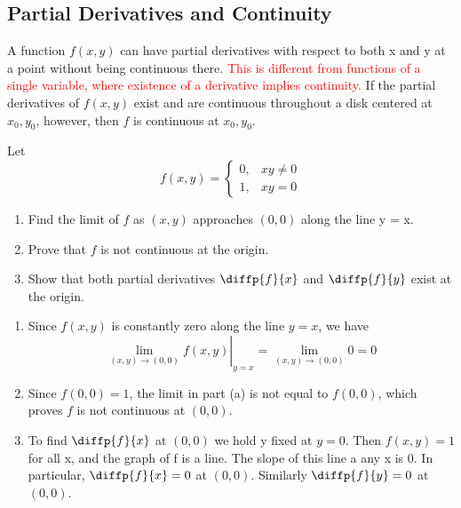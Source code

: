 \documentclass[12pt,a4paper,draft]{article}
\begin{document}
\subsection{Partial Derivatives and Continuity}

A function \(f(x,y)\) can have partial derivatives with respect to both x and y at a point without being continuous there. \textcolor{red}{This is different from functions of a single variable, where existence of a derivative implies continuity.} If the partial derivatives of \(f(x,y)\) exist and are continuous throughout a disk centered at \(x_0,y_0\), however, then \(f\) is continuous at \(x_0,y_0\).

\begin{example}
    Let
    \[f(x,y) = \begin{cases}
        0, & xy \neq 0 \\
        1, & xy = 0
    \end{cases}\]

    \begin{enumerate}[label=\textbf{(\alph*)}]
        \item Find the limit of \(f\) as \((x,y)\) approaches \((0,0)\) along the line y = x.
        \item Prove that \(f\) is not continuous at the origin.
        \item Show that both partial derivatives \(\diffp{f}{x}\) and \(\diffp{f}{y}\) exist at the origin.
        
    \end{enumerate}

\end{example}


\begin{solution}
    \begin{enumerate}[label=\textbf{(\alph*)}]
        \item Since \(f(x,y)\) is constantly zero along the line \(y=x\), we have \[\left. \lim_{(x,y) \to (0,0)} f(x,y) \right|_{y=x} = \lim_{(x,y) \to (0,0)} 0 = 0\]
        \item Since \(f(0,0) = 1\), the limit in part (a) is not equal to \(f(0,0)\), which proves \(f\) is not continuous at \((0,0)\).
        \item To find \(\diffp{f}{x}\) at \((0,0)\) we hold y fixed at  \(y=0\). Then \(f(x,y) = 1\) for all x, and the graph of f is a line. The slope of this line a any x is 0. In particular, \(\diffp{f}{x} = 0\) at \((0,0)\). Similarly \(\diffp{f}{y} = 0\) at \((0,0)\).
    \end{enumerate}
\end{solution}
\end{document}
